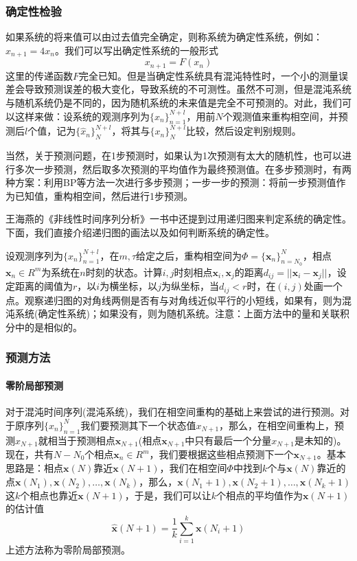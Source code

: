         \subsubsection{确定性检验}
            \par
            如果系统的将来值可以由过去值完全确定，则称系统为确定性系统，例如：$x_{n+1} = 4x_n$。我们可以写出确定性系统的一般形式
            \[
                x_{n+1} = F(x_n)
            \]
            这里的传递函数$F$完全已知。但是当确定性系统具有混沌特性时，一个小的测量误差会导致预测误差的极大变化，导致系统的不可测性。虽然不可测，但是混沌系统与随机系统仍是不同的，因为随机系统的未来值是完全不可预测的。对此，我们可以这样来做：设系统的观测序列为$\{x_n\}_{n = 1}^{N+l}$，用前$N$个观测值来重构相空间，并预测后$l$个值，记为$\{\hat{x}_n\}_N^{N+l}$，将其与$\{x_n\}_N^{N+l}$比较，然后设定判别规则。
            \par
            当然，关于预测问题，在1步预测时，如果认为1次预测有太大的随机性，也可以进行多次一步预测，然后取多次预测的平均值作为最终预测值。在多步预测时，有两种方案：利用BP等方法一次进行多步预测；一步一步的预测：将前一步预测值作为已知值，重构相空间，然后进行1步预测。
            \par
            王海燕的《非线性时间序列分析》一书中还提到过用递归图来判定系统的确定性。下面，我们直接介绍递归图的画法以及如何判断系统的确定性。
            \par
            设观测序列为$\{x_n\}_{n = 1}^{N+l}$，在$m,\tau$给定之后，重构相空间为$\Phi = \{\mathbf{x}_n\}_{n = N_0}^N$，相点$\mathbf{x}_n \in R^m$为系统在$n$时刻的状态。计算$i,j$时刻相点$\mathbf{x}_i,\mathbf{x}_j$的距离$d_{ij} = ||\mathbf{x}_i - \mathbf{x}_j||$，设定距离的阈值为$r$，以$i$为横坐标，以$j$为纵坐标，当$d_{ij}<r$时，在$(i,j)$处画一个点。观察递归图的对角线两侧是否有与对角线近似平行的小短线，如果有，则为混沌系统(确定性系统)；如果没有，则为随机系统。注意：上面方法中的量和关联积分中的是相似的。

        \subsubsection{预测方法}
            \paragraph{零阶局部预测}
            对于混沌时间序列(混沌系统)，我们在相空间重构的基础上来尝试的进行预测。对于原序列$\{x_n\}_{n = 1}^{N}$我们要预测其下一个状态值$x_{N+1}$，那么，在相空间重构上，预测$x_{N+1}$就相当于预测相点$\mathbf{x}_{N+1}$(相点$\mathbf{x}_{N+1}$中只有最后一个分量$x_{N+1}$是未知的)。现在，共有$N - N_0$个相点$\mathbf{x}_n \in R^m$，我们要根据这些相点预测下一个$\mathbf{x}_{N+1}$。基本思路是：相点$\mathbf{x}(N)$靠近$\mathbf{x} (N+1)$，我们在相空间$\Phi$中找到$k$个与$\mathbf{x}(N)$靠近的点$\mathbf{x}(N_1),\mathbf{x}(N_2),\dots,\mathbf{x}(N_k)$，那么，$\mathbf{x}(N_1+1),\mathbf{x}(N_2+1),\dots,\mathbf{x}(N_k+1)$这$k$个相点也靠近$\mathbf{x} (N+1)$，于是，我们可以让$k$个相点的平均值作为$\mathbf{x} (N+1)$的估计值
            \[
                \hat{\mathbf{x}} (N+1) = \frac{1}{k} \sum_{i = 1}^k \mathbf{x}(N_i+1)
            \]
            上述方法称为零阶局部预测。

